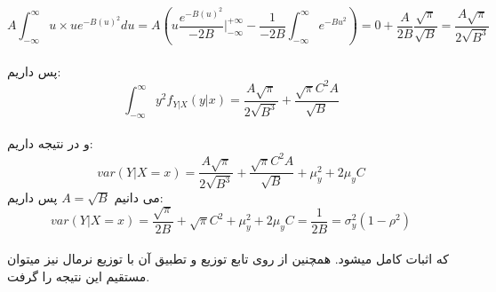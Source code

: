  \[
    A\int_{-\infty}^{\infty}{u\times ue^{-B(u)^2}}du = 
    A(u\frac{e^{-B(u)^2}}{-2B}|_{-\infty}^{+\infty} - \frac{1}{-2B}\int_{-\infty}^{\infty}{e^{-Bu^2}})
    = 0 + \frac{A}{2B}\frac{\sqrt{\pi}}{\sqrt{B}}
    = \frac{A\sqrt{\pi}}{2\sqrt{B^3}}
 \]\\
 پس داریم:\\
 \[
    \int_{-\infty}^{\infty}{y^2f_{Y|X}(y|x)}
    = \frac{A\sqrt{\pi}}{2\sqrt{B^3}} + \frac{\sqrt{\pi}C^2A}{\sqrt{B}}
 \]
\\
و در نتیجه داریم:\\
\[
    var(Y|X = x) =\frac{A\sqrt{\pi}}{2\sqrt{B^3}} 
    + \frac{\sqrt{\pi}C^2A}{\sqrt{B}}
    +\mu_y^2+2\mu_y C
\]
می دانیم $A = \sqrt{B}$ پس داریم:\\
\[
    var(Y|X = x) =\frac{\sqrt{\pi}}{2B} 
    + \sqrt{\pi}C^2
    +\mu_y^2+2\mu_y C
    = \frac{1}{2B} = \sigma_y^2(1-\rho^2)
\]\\
که اثبات کامل میشود. همچنین از روی تابع توزیع و تطبیق آن با توزیع نرمال نیز
میتوان مستقیم این نتیجه را گرفت.

\parte{}
\\\\